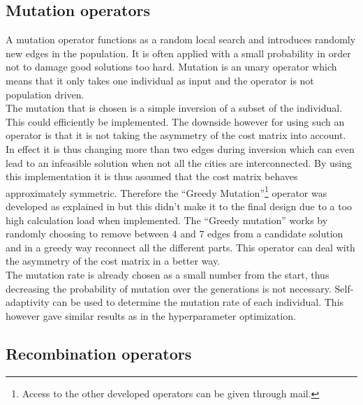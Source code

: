 \documentclass[a4paper,10pt]{article}
\begin{document}
\subsection{Mutation operators}\label{s:mutation}

A mutation operator functions as a random local search and introduces randomly new edges in the population. It is often applied with a small probability in order not to damage good solutions too hard. Mutation is an unary operator which means that it only takes one individual as input and the operator is not population driven.\\
The mutation that is chosen is a simple inversion of a subset of the individual. This could efficiently be implemented. The downside however for using such an operator is that it is not taking the asymmetry of the cost matrix into account. In effect it is thus changing more than two edges during inversion which can even lead to an infeasible solution when not all the cities are interconnected. By using this implementation it is thus assumed that the cost matrix behaves approximately symmetric. Therefore the ``Greedy Mutation''\footnote{Access to the other developed operators can be given through mail.} operator was developed as explained in \cite{Reisleben1996} but this didn't make it to the final design due to a too high calculation load when implemented. The ``Greedy mutation'' works by randomly choosing to remove between $4$ and $7$ edges from a candidate solution and in a greedy way reconnect all the different parts. This operator can deal with the asymmetry of the cost matrix in a better way.\\
The mutation rate is already chosen as a small number from the start, thus decreasing the probability of mutation over the generations is not necessary. Self-adaptivity can be used to determine the mutation rate of each individual. This however gave similar results as in the hyperparameter optimization.

\subsection{Recombination operators}\label{s:cross_over}
\end{document}
